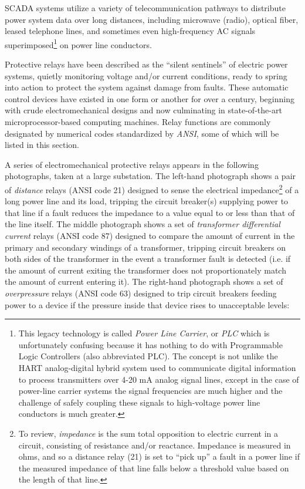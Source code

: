 SCADA systems utilize a variety of telecommunication pathways to distribute power system data over long distances, including microwave (radio), optical fiber, leased telephone lines, and sometimes even high-frequency AC signals superimposed\footnote{This legacy technology is called \textit{Power Line Carrier}, or \textit{PLC} which is unfortunately confusing because it has nothing to do with Programmable Logic Controllers (also abbreviated PLC).  The concept is not unlike the HART analog-digital hybrid system used to communicate digital information to process transmitters over 4-20 mA analog signal lines, except in the case of power-line carrier systems the signal frequencies are much higher and the challenge of safely coupling these signals to high-voltage power line conductors is much greater.} on power line conductors.  

\vskip 10pt

\filbreak

Protective relays have been described as the ``silent sentinels'' of electric power systems, quietly monitoring voltage and/or current conditions, ready to spring into action to protect the system against damage from faults.  These automatic control devices have existed in one form or another for over a century, beginning with crude electromechanical designs and now culminating in state-of-the-art microprocessor-based computing machines.  Relay functions are commonly designated by numerical codes standardized by \textit{ANSI}, some of which will be listed in this section.  

A series of electromechanical protective relays appears in the following photographs, taken at a large substation.  The left-hand photograph shows a pair of \textit{distance} relays (ANSI code 21) designed to sense the electrical impedance\footnote{To review, \textit{impedance} is the sum total opposition to electric current in a circuit, consisting of resistance and/or reactance.  Impedance is measured in ohms, and so a distance relay (21) is set to ``pick up'' a fault in a power line if the measured impedance of that line falls below a threshold value based on the length of that line.} of a long power line and its load, tripping the circuit breaker(s) supplying power to that line if a fault reduces the impedance to a value equal to or less than that of the line itself.  The middle photograph shows a set of \textit{transformer differential current} relays (ANSI code 87) designed to compare the amount of current in the primary and secondary windings of a transformer, tripping circuit breakers on both sides of the transformer in the event a transformer fault is detected (i.e. if the amount of current exiting the transformer does not proportionately match the amount of current entering it).  The right-hand photograph shows a set of \textit{overpressure} relays (ANSI code 63) designed to trip circuit breakers feeding power to a device if the pressure inside that device rises to unacceptable levels:  
 

